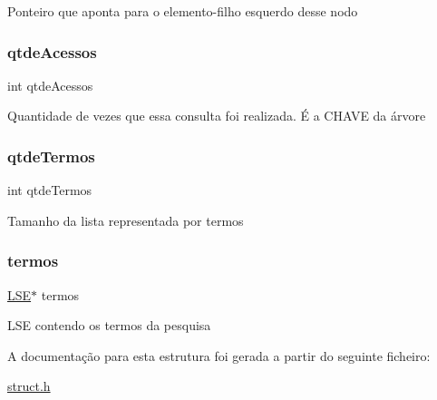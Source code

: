 Ponteiro que aponta para o elemento-\/filho esquerdo desse nodo \mbox{\label{structabp_a2ca276b8f2f9e2a163dc0d9504e846c2}} 
\subsubsection{\texorpdfstring{qtde\+Acessos}{qtdeAcessos}}
{\footnotesize\ttfamily int qtde\+Acessos}

Quantidade de vezes que essa consulta foi realizada. É a C\+H\+A\+VE da árvore \mbox{\label{structabp_aba05845525837a0260605d109242fb49}} 
\subsubsection{\texorpdfstring{qtde\+Termos}{qtdeTermos}}
{\footnotesize\ttfamily int qtde\+Termos}

Tamanho da lista representada por {\ttfamily termos} \mbox{\label{structabp_a455687e406c855e366193f3ba638ed6d}} 
\subsubsection{\texorpdfstring{termos}{termos}}
{\footnotesize\ttfamily \hyperlink{struct_8h_a0d3de75d86bf1db6f749c91f755b870c}{L\+SE}$\ast$ termos}

{\ttfamily L\+SE} contendo os termos da pesquisa 

A documentação para esta estrutura foi gerada a partir do seguinte ficheiro\+:\begin{DoxyCompactItemize}
\item 
\hyperlink{struct_8h}{struct.\+h}\end{DoxyCompactItemize}
